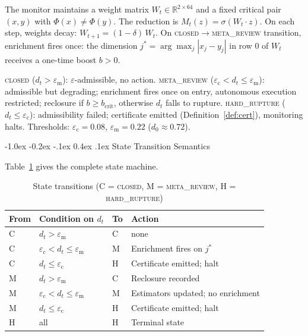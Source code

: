\documentclass{llncs}
\makeatletter
\renewcommand\subsection{\@startsection{subsection}{2}{\z@}%
  {-1.0ex \@plus -0.2ex \@minus -.1ex}%
  {0.4ex \@plus .1ex}%
  {\normalfont\normalsize\bfseries}}
\newcommand{\ecollapse}{\varepsilon_{\mathrm{c}}}
\newcommand{\emeta}{\varepsilon_{\mathrm{m}}}
\newcommand{\st}[1]{\textup{\textsc{#1}}}
\makeatother
\begin{document}
The monitor maintains a weight matrix $W_t \in \mathbb{R}^{2 \times 64}$
and a fixed critical pair $(x, y)$ with $\Phi(x) \neq \Phi(y)$.
The reduction is $M_t(z) = \sigma(W_t \cdot z)$.
On each step, weights decay: $W_{t+1} = (1-\delta)\,W_t$.
On \st{closed}$\to$\st{meta\_review} transition, enrichment fires
once: the dimension $j^* = \arg\max_j |x_j - y_j|$ in row 0 of $W_t$
receives a one-time boost $b > 0$.

\st{closed} ($d_t > \emeta$): $\varepsilon$-admissible, no action.
\st{meta\_review} ($\ecollapse < d_t \leq \emeta$): admissible but
degrading; enrichment fires once on entry, autonomous execution
restricted; reclosure if $b \geq b_{\mathrm{crit}}$, otherwise $d_t$
falls to rupture. \st{hard\_rupture} ($d_t \leq \ecollapse$):
admissibility failed; certificate emitted (Definition~\ref{def:cert}),
monitoring halts. Thresholds: $\ecollapse = 0.08$, $\emeta = 0.22$
($d_0 \approx 0.72$).

\subsection{State Transition Semantics}

Table~\ref{tab:transitions} gives the complete state machine.

\begin{table}[tbp]
\centering
\caption{State transitions (C = \st{closed}, M = \st{meta\_review},
  H = \st{hard\_rupture})}
\label{tab:transitions}
\small
\begin{tabular}{llll}
\toprule
\textbf{From} & \textbf{Condition on $d_t$} & \textbf{To} & \textbf{Action} \\
\midrule
C & $d_t > \emeta$             & C & none \\
C & $\ecollapse < d_t \leq \emeta$ & M & Enrichment fires on $j^*$ \\
C & $d_t \leq \ecollapse$         & H & Certificate emitted; halt \\
M & $d_t > \emeta$             & C & Reclosure recorded \\
M & $\ecollapse < d_t \leq \emeta$ & M & Estimators updated; no enrichment \\
M & $d_t \leq \ecollapse$         & H & Certificate emitted; halt \\
H & all                        & H & Terminal state \\
\bottomrule
\end{tabular}
\end{table}
\end{document}

